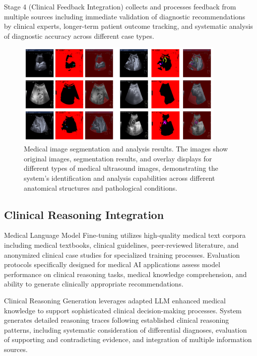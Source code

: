 Stage 4 (Clinical Feedback Integration) collects and processes feedback from multiple sources including immediate validation of diagnostic recommendations by clinical experts, longer-term patient outcome tracking, and systematic analysis of diagnostic accuracy across different case types.

\begin{figure}[htbp]
\centering
\includegraphics[width=0.9\textwidth]{figures/Med/medsam_result.png}
\caption{Medical image segmentation and analysis results. The images show original images, segmentation results, and overlay displays for different types of medical ultrasound images, demonstrating the system's identification and analysis capabilities across different anatomical structures and pathological conditions.}
\label{fig:medsam_result}
\end{figure}

\subsection{Clinical Reasoning Integration}

Medical Language Model Fine-tuning utilizes high-quality medical text corpora including medical textbooks, clinical guidelines, peer-reviewed literature, and anonymized clinical case studies for specialized training processes. Evaluation protocols specifically designed for medical AI applications assess model performance on clinical reasoning tasks, medical knowledge comprehension, and ability to generate clinically appropriate recommendations.

Clinical Reasoning Generation leverages adapted LLM enhanced medical knowledge to support sophisticated clinical decision-making processes. System generates detailed reasoning traces following established clinical reasoning patterns, including systematic consideration of differential diagnoses, evaluation of supporting and contradicting evidence, and integration of multiple information sources.

